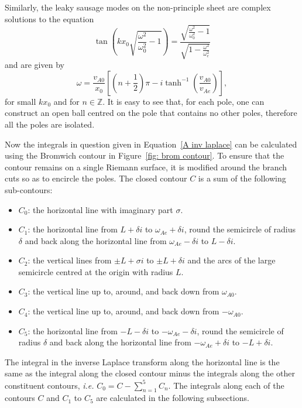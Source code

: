\documentclass[12pt]{../style-files/ociamthesis}
\begin{document}
Similarly, the leaky sausage modes on the non-principle sheet are complex solutions to the equation
\begin{equation}
\tan\left(kx_0\sqrt{\frac{\omega^2}{\omega_0^2} - 1}\right) = \frac{\sqrt{\frac{\omega^2}{\omega_0^2} - 1}}{\sqrt{1 - \frac{\omega^2}{\omega_e^2}}}
\end{equation}
and are given by
\begin{equation}
\omega = \frac{v_{A0}}{x_0}\left[ (n + \frac{1}{2})\pi - i\tanh^{-1}\left( \frac{v_{A0}}{v_{Ae}} \right) \right],
\end{equation}
for small $kx_0$ and for $n \in \mathbb{Z}$. It is easy to see that, for each pole, one can construct an open ball centred on the pole that contains no other poles, therefore all the poles are isolated.

Now the integrals in question given in Equation~\eqref{A inv laplace} can be calculated using the Bromwich contour in Figure~\ref{fig: brom contour}. To ensure that the contour remains on a single Riemann surface, it is modified around the branch cuts so as to encircle the poles. The closed contour $C$ is a sum of the following sub-contours:
\begin{itemize}
	\item $C_0$: the horizontal line with imaginary part $\sigma$.
	\item $C_1$: the horizontal line from $L + \delta i$ to $\omega_{Ae} + \delta i$, round the semicircle of radius $\delta$ and back along the horizontal line from $\omega_{Ae} - \delta i$ to $L - \delta i$.
	\item $C_2$: the vertical lines from $\pm L + \sigma i$ to $\pm L + \delta i$ and the arcs of the large semicircle centred at the origin with radius $L$.
	\item $C_3$: the vertical line up to, around, and back down from $\omega_{A0}$.
	\item $C_4$: the vertical line up to, around, and back down from $-\omega_{A0}$.
	\item $C_5$: the horizontal line from $-L - \delta i$ to $-\omega_{Ae} - \delta i$, round the semicircle of radius $\delta$ and back along the horizontal line from $-\omega_{Ae} + \delta i$ to $-L + \delta i$.
\end{itemize}
The integral in the inverse Laplace transform along the horizontal line is the same as the integral along the closed contour minus the integrals along the other constituent contours, \textit{i.e.} $C_0 = C - \sum_{n = 1}^{5}C_n$. The integrals along each of the contours $C$ and $C_1$ to $C_5$ are calculated in the following subsections.
\end{document}
